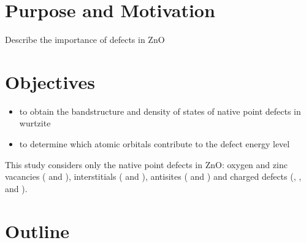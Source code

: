 \section{Purpose and Motivation}
Describe the importance of defects in ZnO
\section{Objectives}
\begin{itemize}
    \item to obtain the bandstructure and density of states of native point defects in wurtzite 
    \item to determine which atomic orbitals  contribute to the defect energy level
\end{itemize}

This study considers only the native point defects in ZnO: oxygen and zinc vacancies ( and ), interstitials ( and ), antisites ( and ) and charged defects (, ,  and ). 
\section{Outline}

